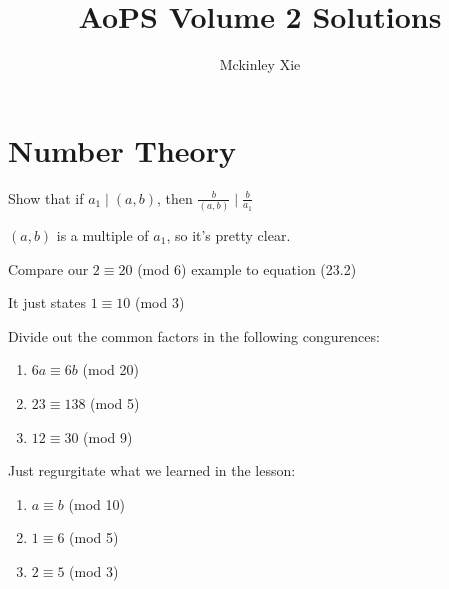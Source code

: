 \documentclass{scrartcl}
\title{AoPS Volume 2 Solutions}
\author{Mckinley Xie}
\begin{document}
\maketitle
\tableofcontents

\setcounter{section}{22}
\section{Number Theory}
\begin{exercise}
	Show that if $a_1 \mid (a,b)$, then $\frac{b}{(a,b)} \mid \frac{b}{a_1}$
	\begin{soln}
		$(a,b)$ is a multiple of $a_1$, so it's pretty clear.
	\end{soln}
\end{exercise}

\begin{exercise}
	Compare our $2 \equiv 20$ (mod 6) example to equation (23.2)
	\begin{soln}
		It just states $1 \equiv 10$ (mod 3)
	\end{soln}
\end{exercise}

\begin{exercise}
	Divide out the common factors in the following congurences:
	\begin{enumerate}
	\item $6a \equiv 6b$ (mod 20)
	\item $23 \equiv 138$ (mod 5)
	\item $12 \equiv 30$ (mod 9)
	\end{enumerate}
	\begin{soln} Just regurgitate what we learned in the lesson:
		\begin{enumerate}
			\item $a \equiv b$ (mod 10)
			\item $1 \equiv 6$ (mod 5)
			\item $2 \equiv 5$ (mod 3)
		\end{enumerate}
	\end{soln}
\end{exercise}
\end{document}
